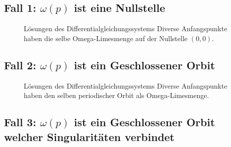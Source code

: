 \subsection{Fall 1: $\omega(p)$ ist eine Nullstelle} \label{poinbendix:subsection:fall1}

\begin{figure}
    \centering
    
    \caption{Lösungen des Differentialgleichungssystems %
    Diverse Anfangspunkte haben die selbe Omega-Limesmenge auf der Nullstelle $(0,0)$.}
    \label{poinbendix:fig:fixed_point_omega_set}
\end{figure}

\subsection{Fall 2: $\omega(p)$ ist ein Geschlossener Orbit} \label{poinbendix:subsection:fall2}

\begin{figure}
\centering
    
    \caption{Lösungen des Differentialgleichungssystems %
    Diverse Anfangspunkte haben den selben periodischer Orbit als Omega-Limesmenge.}
\label{poinbendix:fig:fixed_point_omega_set}
\end{figure}

\subsection{Fall 3: $\omega(p)$ ist ein Geschlossener Orbit welcher Singularitäten verbindet} \label{poinbendix:subsection:fall3}

